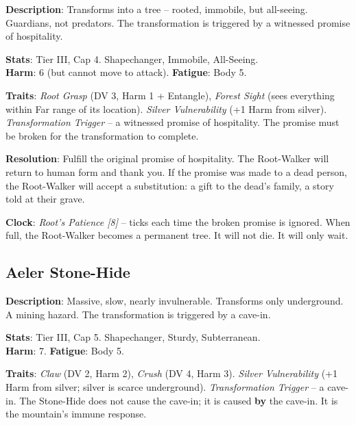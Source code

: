 \noindent\textbf{Description}: Transforms into a tree -- rooted, immobile, but all-seeing. Guardians, not predators. The transformation is triggered by a witnessed promise of hospitality.

\noindent\textbf{Stats}: Tier III, Cap 4. Shapechanger, Immobile, All-Seeing.\\
\textbf{Harm}: 6 (but cannot move to attack). \textbf{Fatigue}: Body 5.

\noindent\textbf{Traits}: 
\emph{Root Grasp} (DV 3, Harm 1 + Entangle), \emph{Forest Sight} (sees everything within Far range of its location). \emph{Silver Vulnerability} (+1 Harm from silver). \emph{Transformation Trigger} -- a witnessed promise of hospitality. The promise must be broken for the transformation to complete.

\noindent\textbf{Resolution}: Fulfill the original promise of hospitality. The Root-Walker will return to human form and thank you. If the promise was made to a dead person, the Root-Walker will accept a substitution: a gift to the dead's family, a story told at their grave.

\noindent\textbf{Clock}: \emph{Root's Patience [8]} -- ticks each time the broken promise is ignored. When full, the Root-Walker becomes a permanent tree. It will not die. It will only wait.


\subsection*{Aeler Stone-Hide}

\noindent\textbf{Description}: Massive, slow, nearly invulnerable. Transforms only underground. A mining hazard. The transformation is triggered by a cave-in.

\noindent\textbf{Stats}: Tier III, Cap 5. Shapechanger, Sturdy, Subterranean.\\
\textbf{Harm}: 7. \textbf{Fatigue}: Body 5.

\noindent\textbf{Traits}: 
\emph{Claw} (DV 2, Harm 2), \emph{Crush} (DV 4, Harm 3). \emph{Silver Vulnerability} (+1 Harm from silver; silver is scarce underground). \emph{Transformation Trigger} -- a cave-in. The Stone-Hide does not cause the cave-in; it is caused \textbf{by} the cave-in. It is the mountain's immune response.

